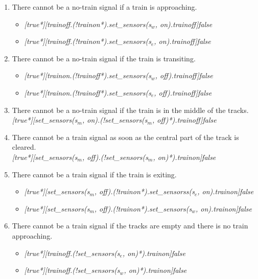\documentclass[final]{report}
\begin{document}
\begin{enumerate}
\item There cannot be a no-train signal if a train is approaching.
\begin{itemize}
\item \textit{[true*][trainoff.(!trainon*).set\_sensors(s$_{w}$, on).trainoff]false}
\item \textit{[true*][trainoff.(!trainon*).set\_sensors(s$_{e}$, on).trainoff]false} 
\end{itemize}

\item There cannot be a no-train signal if the train is transiting.
\begin{itemize}
\item \textit{[true*][trainon.(!trainoff*).set\_sensors(s$_{w}$, off).trainoff]false}
\item \textit{[true*][trainon.(!trainoff*).set\_sensors(s$_{e}$, off).trainoff]false}
\end{itemize}

\item There cannot be a no-train signal if the train is in the middle of the tracks.\\
\textit{[true*][set\_sensors(s$_{m}$, on).(!set\_sensors(s$_{m}$, off)*).trainoff]false}

\item There cannot be a train signal as soon as the central part of the track is cleared.\\
\textit{[true*][set\_sensors(s$_{m}$, off).(!set\_sensors(s$_{m}$, on)*).trainon]false
}

\item There cannot be a train signal if the train is exiting.
\begin{itemize}
\item \textit{[true*][set\_sensors(s$_{m}$, off).(!trainon*).set\_sensorss(s$_{e}$, on).trainon]false}
\item \textit{[true*][set\_sensors(s$_{m}$, off).(!trainon*).set\_sensors(s$_{w}$, on).trainon]false}
\end{itemize}

\item There cannot be a train signal if the tracks are empty and there is no train approaching.
\begin{itemize}
\item \textit{[true*][trainoff.(!set\_sensors(s$_{e}$, on)*).trainon]false}
\item \textit{[true*][trainoff.(!set\_sensors(s$_{w}$, on)*).trainon]false}
\end{itemize}

\end{enumerate}
\end{document}
